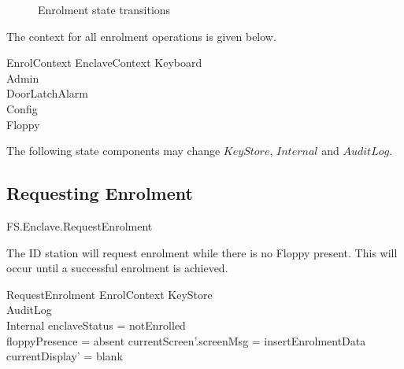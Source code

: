 \begin{figure}[htbp]
  \begin{center}
    \leavevmode
    \caption{Enrolment state transitions}
    \label{fig:enrol}
  \end{center}
\end{figure}

The context for all enrolment operations is given below.

\begin{schema}{EnrolContext}
        EnclaveContext
\also
        \Xi Keyboard
\\      \Xi Admin
\\      \Xi DoorLatchAlarm
\\      \Xi Config
\\      \Xi Floppy
\end{schema}

\begin{Zcomment}
\item
The following state components may change
$KeyStore$, $Internal$ and $AuditLog$. 
\end{Zcomment}


\subsection{Requesting Enrolment}

\begin{traceunit}{FS.Enclave.RequestEnrolment}
\end{traceunit}


The ID station will request enrolment while there is no Floppy
present. This will occur until a successful enrolment is achieved.

\begin{schema}{RequestEnrolment}
        EnrolContext
\also
        \Xi KeyStore
\\      \Xi AuditLog
\\      \Xi Internal
\where
        enclaveStatus = notEnrolled
\\      floppyPresence = absent
\also
        currentScreen'.screenMsg = insertEnrolmentData
\also
        currentDisplay' = blank
\end{schema}

